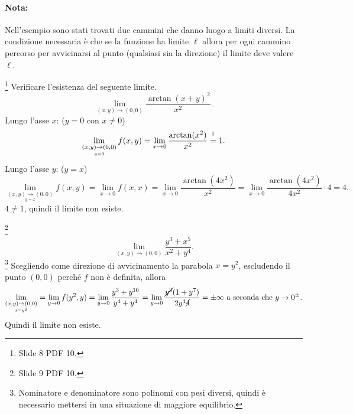\paragraph{Nota:} Nell'esempio sono stati trovati due cammini che danno luogo a limiti diversi. La condizione necessaria è che se la funzione ha limite $\ell$ allora per ogni cammino percorso per avvicinarsi al punto (qualsiasi sia la direzione) il limite deve valere $\ell$.

\begin{example}\footnote{Slide 8 PDF 10.}
    Verificare l'esistenza del seguente limite.
    \begin{equation*}
        \lim\limits_{(x,y)\rightarrow(0,0)}\frac{\arctan(x+y)^2}{x^2}.
    \end{equation*}
    Lungo l'asse $x$: ($y=0$ con $x\neq 0$)
    \begin{equation*}
        \lim\limits_{\underset{y=0}{(x,y)\rightarrow(0,0)}}f(x, y)= \lim\limits_{x\rightarrow 0}\frac{\arctan(x^2)}{x^2}\overset{\footnotemark}{=}1.
    \end{equation*}
    Lungo l'asse $y$: ($y=x$)
    \begin{equation*}
        \lim\limits_{\underset{y=x}{(x,y)\rightarrow (0,0)}}f(x,y)=\lim\limits_{x\rightarrow 0}f(x,x)=\lim\limits_{x\rightarrow 0}\frac{\arctan(4x^2)}{x^2}=\lim\limits_{x\rightarrow 0}\frac{\arctan(4x^2)}{4x^2}\cdot 4=4.
    \end{equation*}
    $4\neq 1$, quindi il limite non esiste.
\end{example}

\begin{example}\footnote{Slide 9 PDF 10.}
    \begin{equation*}
        \lim\limits_{(x,y)\rightarrow(0,0)}\frac{y^3+x^5}{x^2+y^4}.
    \end{equation*}
    \footnote{Nominatore e denominatore sono polinomi con pesi diversi, quindi è necessario mettersi in una situazione di maggiore equilibrio.} Scegliendo come direzione di avvicinamento la parabola $x=y^2$, escludendo il punto $(0,0)$ perché $f$ non è definita, allora
    \begin{equation*}
        \lim\limits_{\underset{x=y^2}{(x,y)\rightarrow(0,0)}}=\lim\limits_{y\rightarrow 0}f(y^2, y)=\lim\limits_{y\rightarrow 0}\frac{y^3+y^{10}}{y^4+y^4}=\lim\limits_{y\rightarrow 0}\frac{\cancel{y^3}(1+y^7)}{2y^4\cancel{4}}=\pm\infty \text{ a seconda che }y\rightarrow 0^{\pm}.
    \end{equation*}
    Quindi il limite non esiste.
\end{example}

